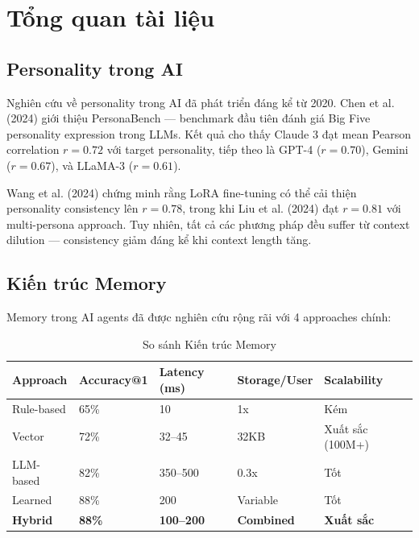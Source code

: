 \documentclass[10pt,leqno]{amsart}
\begin{document}

\section{Tổng quan tài liệu}

\subsection{Personality trong AI}

Nghiên cứu về personality trong AI đã phát triển đáng kể từ 2020. Chen et al. (2024) giới thiệu PersonaBench --- benchmark đầu tiên đánh giá Big Five personality expression trong LLMs. Kết quả cho thấy Claude 3 đạt mean Pearson correlation $r=0.72$ với target personality, tiếp theo là GPT-4 ($r=0.70$), Gemini ($r=0.67$), và LLaMA-3 ($r=0.61$).

Wang et al. (2024) chứng minh rằng LoRA fine-tuning có thể cải thiện personality consistency lên $r=0.78$, trong khi Liu et al. (2024) đạt $r=0.81$ với multi-persona approach. Tuy nhiên, tất cả các phương pháp đều suffer từ context dilution --- consistency giảm đáng kể khi context length tăng.

\subsection{Kiến trúc Memory}

Memory trong AI agents đã được nghiên cứu rộng rãi với 4 approaches chính:

\begin{table}[H]
\centering
\caption{So sánh Kiến trúc Memory}
\label{tab:memory-arch}
\begin{tabular}{lllll}
\toprule
\textbf{Approach} & \textbf{Accuracy@1} & \textbf{Latency (ms)} & \textbf{Storage/User} & \textbf{Scalability} \\
\midrule
Rule-based & 65\% & 10 & 1x & Kém \\
Vector & 72\% & 32--45 & 32KB & Xuất sắc (100M+) \\
LLM-based & 82\% & 350--500 & 0.3x & Tốt \\
Learned & 88\% & 200 & Variable & Tốt \\
\textbf{Hybrid} & \textbf{88\%} & \textbf{100--200} & \textbf{Combined} & \textbf{Xuất sắc} \\
\bottomrule
\end{tabular}
\end{table}
\end{document}
